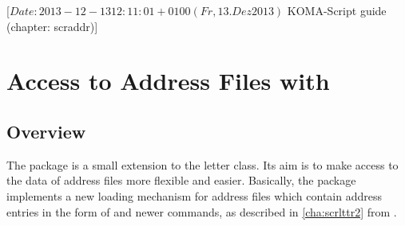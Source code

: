 %
%
%
%
%
%
%
%
% 
%
%
%
%

                 [$Date: 2013-12-13 12:11:01 +0100 (Fr, 13. Dez 2013) $
                  KOMA-Script guide (chapter: scraddr)]


\chapter{Access to Address Files with }%
%

\section{Overview}\label{sec:scraddr.overview}
The package  is a small extension to the {\KOMAScript} letter
class.  Its aim is to make access to the data of address files more flexible
and easier.  Basically, the package implements a new loading mechanism for
address files which contain address entries in the form of 
and newer  commands, as described in \autoref{cha:scrlttr2}
from .

